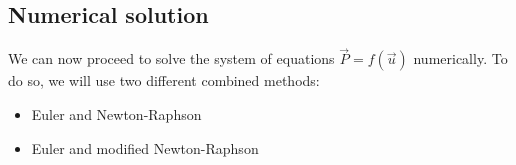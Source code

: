 \subsection{Numerical solution}

We can now proceed to solve the system of equations ${\vec{P}} = f({\vec{u}})$ numerically.
To do so, we will use two different combined methods:

\begin{itemize}
    \item Euler and Newton-Raphson
    \item Euler and modified Newton-Raphson
\end{itemize}





